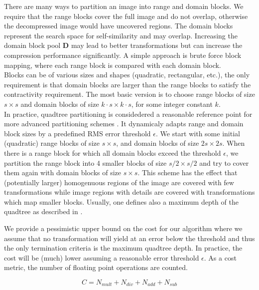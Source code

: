 There are many ways to partition an image into range and domain blocks. We require that the range blocks cover the full image and do not overlap, otherwise the
decompressed image would have uncovered regions. The domain blocks represent the search space for self-similarity and may overlap.
Increasing the domain block pool $\boldsymbol{D}$ may lead to better transformations but can increase the compression performance significantly.
A simple approach is brute force block mapping, where each range block is compared with each domain block.\\
Blocks can be of various sizes and shapes (quadratic, rectangular, etc.), the only requirement is that domain blocks are larger than the range blocks to satisfy the
contractivity requirement. The most basic version is to choose range blocks of size $s \times s$ and domain blocks of size $k\cdot s \times k \cdot s$, for some
integer constant $k$.\\
In practice, quadtree partitioning is considedered a reasonable reference point for more advanced partitioning schemes \cite{fisher2012}.
It dynamicaly adapts range and domain block sizes by a predefined RMS error threshold $\epsilon$.
We start with some initial (quadratic) range blocks of size $s \times s$, and domain blocks of size $2s \times 2s$.
When there is a range block for which all domain blocks exceed the threshold $\epsilon$, we partition
the range block into 4 smaller blocks of size $s/2 \times s/2$ and try to cover them again with domain blocks of size $s \times s$.
This scheme has the effect that (potentially larger) homogenuous regions of the image are covered with few transformations while image
regions with details are covered with transformations which map smaller blocks.
Usually, one defines also a maximum depth of the quadtree as described in \cite{fisher2012}.

 We provide a pessimistic upper bound on the cost for our
algorithm where we assume that no transformation will yield at an error below
the threshold and thus the only termination criteria is the maximum quadtree
depth. In practice, the cost will be (much) lower assuming a reasonable error
threshold $\epsilon$. As a cost metric, the number of floating point operations
are counted.


$$
C = N_{mult} + N_{div} + N_{add} + N_{sub}
$$


